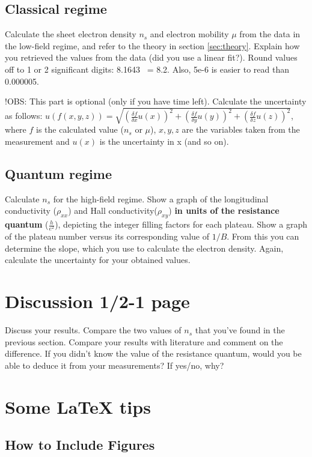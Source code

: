 \documentclass[letter]{article}
\begin{document}
\subsection{Classical regime}
Calculate the sheet electron density $n_{s}$ and electron mobility $\mu$ from the data in the low-field regime, and refer to the theory in section \ref{sec:theory}. Explain how you retrieved the values from the data (did you use a linear fit?).
Round values off to 1 or 2 significant digits: 8.1643 ~= 8.2. Also, 5e-6 is easier to read than 0.000005.

!OBS: This part is optional (only if you have time left).
Calculate the uncertainty as follows: \newline $u(f(x, y, z)) = \sqrt{(\frac{\delta f}{\delta{x}} u(x))^{2} + (\frac{\delta f}{\delta{y}} u(y))^{2} + (\frac{\delta f}{\delta{z}} u(z))^{2}}$, where $f$ is the calculated value ($n_{s}$ or $\mu$), $x, y, z$ are the variables taken from the measurement and $u(x)$ is the uncertainty in x (and so on).

\subsection{Quantum regime}
Calculate $n_{s}$ for the high-field regime.
Show a graph of the longitudinal conductivity ($\rho_{xx}$) and Hall conductivity($\rho_{xy}$) \textbf{in units of the resistance quantum} ($\frac{h}{e^{2}}$), depicting the integer filling factors for each plateau.
Show a graph of the plateau number versus its corresponding value of $1/B$. From this you can determine the slope, which you use to calculate the electron density.
Again, calculate the uncertainty for your obtained values.

\section{Discussion 1/2-1 page}
Discuss your results. Compare the two values of $n_{s}$ that you've found in the previous section. Compare your results with literature and comment on the difference. If you didn't know the value of the resistance quantum, would you be able to deduce it from your measurements? If yes/no, why?

\newpage
\section{Some LaTeX tips}
\label{sec:latex}
\subsection{How to Include Figures}
\end{document}
